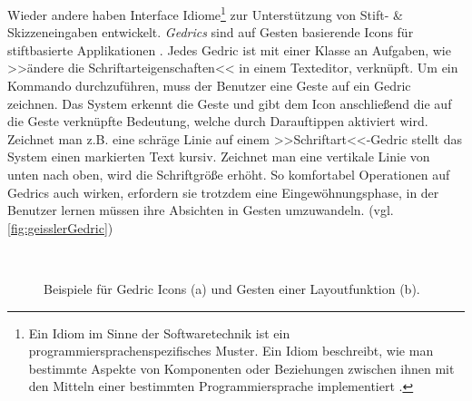 \medskip Wieder andere haben Interface Idiome\footnote{Ein Idiom im Sinne der Softwaretechnik ist ein programmiersprachenspezifisches Muster. Ein Idiom beschreibt, wie man bestimmte Aspekte von Komponenten oder Beziehungen zwischen ihnen mit den Mitteln einer bestimmten Programmiersprache implementiert \citep{Buschmann:1998}.} zur Unterstützung von Stift- \& Skizzeneingaben entwickelt. \emph{Gedrics} sind auf Gesten basierende Icons für stiftbasierte Applikationen \citep{Geissler:1995}. Jedes Gedric ist mit einer Klasse an Aufgaben, wie >>ändere die Schriftarteigenschaften<< in einem Texteditor, verknüpft. Um ein Kommando durchzuführen, muss der Benutzer eine Geste auf ein Gedric zeichnen. Das System erkennt die Geste und gibt dem Icon anschließend die auf die Geste verknüpfte Bedeutung, welche durch Darauftippen aktiviert wird. Zeichnet man z.B. eine schräge Linie auf einem >>Schriftart<<-Gedric stellt das System einen markierten Text kursiv. Zeichnet man eine vertikale Linie von unten nach oben, wird die Schriftgröße erhöht. \clearpage So komfortabel Operationen auf Gedrics auch wirken, erfordern sie trotzdem eine Eingewöhnungsphase, in der Benutzer lernen müssen ihre Absichten in Gesten umzuwandeln. (vgl. \autoref{fig:geisslerGedric}) 

\begin{figure}
        \myfloatalign
         \quad
         \\
        \caption[Gedric \newline \citep{Geissler:1995}]{Beispiele für Gedric Icons (a) und Gesten einer Layoutfunktion (b).}\label{fig:geisslerGedric}
\end{figure}

